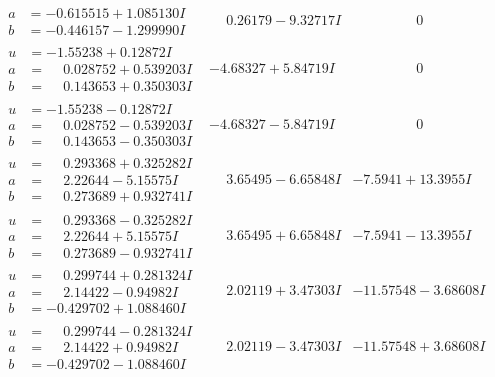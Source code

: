 \documentclass[1p]{elsarticle_modified}
\theoremstyle{definition}
\begin{document}
$$\begin{array}{c|c|c}
\begin{aligned}
a &= -0.615515 + 1.085130 I \\
b &= -0.446157 - 1.299990 I\end{aligned}
 & \phantom{-}0.26179 - 9.32717 I & \phantom{-0.000000 } 0 \\ \hline\begin{aligned}
u &= -1.55238 + 0.12872 I \\
a &= \phantom{-}0.028752 + 0.539203 I \\
b &= \phantom{-}0.143653 + 0.350303 I\end{aligned}
 & -4.68327 + 5.84719 I & \phantom{-0.000000 } 0 \\ \hline\begin{aligned}
u &= -1.55238 - 0.12872 I \\
a &= \phantom{-}0.028752 - 0.539203 I \\
b &= \phantom{-}0.143653 - 0.350303 I\end{aligned}
 & -4.68327 - 5.84719 I & \phantom{-0.000000 } 0 \\ \hline\begin{aligned}
u &= \phantom{-}0.293368 + 0.325282 I \\
a &= \phantom{-}2.22644 - 5.15575 I \\
b &= \phantom{-}0.273689 + 0.932741 I\end{aligned}
 & \phantom{-}3.65495 - 6.65848 I & -7.5941 + 13.3955 I \\ \hline\begin{aligned}
u &= \phantom{-}0.293368 - 0.325282 I \\
a &= \phantom{-}2.22644 + 5.15575 I \\
b &= \phantom{-}0.273689 - 0.932741 I\end{aligned}
 & \phantom{-}3.65495 + 6.65848 I & -7.5941 - 13.3955 I \\ \hline\begin{aligned}
u &= \phantom{-}0.299744 + 0.281324 I \\
a &= \phantom{-}2.14422 - 0.94982 I \\
b &= -0.429702 + 1.088460 I\end{aligned}
 & \phantom{-}2.02119 + 3.47303 I & -11.57548 - 3.68608 I \\ \hline\begin{aligned}
u &= \phantom{-}0.299744 - 0.281324 I \\
a &= \phantom{-}2.14422 + 0.94982 I \\
b &= -0.429702 - 1.088460 I\end{aligned}
 & \phantom{-}2.02119 - 3.47303 I & -11.57548 + 3.68608 I \\ \hline\begin{aligned}

\end{aligned}
\end{array}$$
\end{document}
